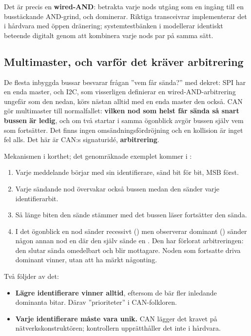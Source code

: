 Det är precis en \textbf{wired-AND}: betrakta varje nods utgång som en ingång till en busstäckande
AND-grind, och  dominerar. Riktiga transceivrar implementerar det i hårdvara med öppen
dränering; systemtestbänken i  modellerar identiskt beteende digitalt genom att
kombinera varje nods par  på samma sätt.

\subsection*{Multimaster, och varför det kräver arbitrering}
De flesta inbyggda bussar besvarar frågan ”vem får sända?” med dekret: SPI har en enda master, och
I2C, som visserligen definierar en wired-AND-arbitrering ungefär som den nedan, körs nästan alltid
med en enda master den också. CAN gör multimaster till normalfallet: \textbf{vilken nod som helst
får sända så snart bussen är ledig}, och om två startar i samma ögonblick avgör bussen själv vem som
fortsätter. Det finns ingen omsändningsfördröjning och en kollision är inget fel alls. Det här är
CAN:s signaturidé, \textbf{arbitrering}.

Mekanismen i korthet; det genomräknade exemplet kommer i :
\begin{enumerate}
  \item Varje meddelande börjar med sin identifierare, sänd bit för bit, MSB först.
  \item Varje sändande nod övervakar också bussen medan den sänder varje identifierarbit.
  \item Så länge biten den sände stämmer med det bussen läser fortsätter den sända.
  \item I det ögonblick en nod sänder recessivt () men observerar dominant () sänder
    någon annan nod en  där den själv sände en . Den har förlorat arbitreringen: den
    slutar sända omedelbart och blir mottagare. Noden som fortsatte driva dominant vinner, utan att
    ha märkt någonting.
\end{enumerate}

Två följder av det:
\begin{itemize}
  \item \textbf{Lägre identifierare vinner alltid}, eftersom de bär fler inledande dominanta bitar.
    Därav ”prioriteter” i CAN-folkloren.
  \item \textbf{Varje identifierare måste vara unik.} CAN lägger det kravet på
    nätverkskonstruktören; kontrollern upprätthåller det inte i hårdvara.
\end{itemize}

